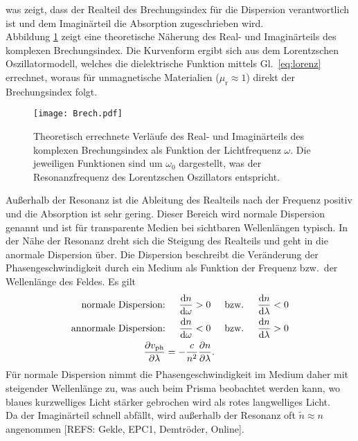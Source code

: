 was zeigt, dass der Realteil des Brechungsindex für die Dispersion verantwortlich ist und dem Imaginärteil die Absorption zugeschrieben wird. \\
Abbildung \ref{fig:brech} zeigt eine theoretische Näherung des Real- und Imaginärteils des komplexen Brechungsindex.
Die Kurvenform ergibt sich aus dem Lorentzschen Oszillatormodell, welches die dielektrische Funktion mittels Gl.~\eqref{eq:lorenz}
errechnet, woraus für unmagnetische Materialien ($\mu_{\text{r}} \approx 1$) direkt der Brechungsindex folgt. 
\begin{figure}[h!]
    \centering
    \texttt{[image: Brech.pdf]}
    \caption{\label{fig:brech}Theoretisch errechnete Verläufe des Real- und Imaginärteils des 
    komplexen Brechungsindex als Funktion der Lichtfrequenz $\omega$. Die jeweiligen Funktionen 
    sind um $\omega_{0}$ dargestellt, was der Resonanzfrequenz des Lorentzschen Oszillators entspricht.}
\end{figure}\FloatBarrier\newpage
Außerhalb der Resonanz ist die Ableitung des Realteils nach der Frequenz positiv und die Absorption ist 
sehr gering. Dieser Bereich wird normale 
Dispersion genannt und ist für transparente Medien bei sichtbaren Wellenlängen typisch. 
In der Nähe der Resonanz dreht sich die Steigung des Realteils und geht in die anormale Dispersion 
über. Die Dispersion beschreibt die Veränderung der Phasengeschwindigkeit durch ein Medium als Funktion 
der Frequenz bzw.~der Wellenlänge des Feldes. Es gilt
\begin{align}
    \text{normale Dispersion:}&\hspace{0.5cm}\frac{\text{d}n}{\text{d}\omega} > 0\hspace{0.5cm}\text{bzw.}\hspace{0.5cm}\frac{\text{d}n}{\text{d}\lambda} < 0 \\
    \text{annormale Dispersion:}&\hspace{0.5cm}\frac{\text{d}n}{\text{d}\omega} < 0\hspace{0.5cm}\text{bzw.}\hspace{0.5cm}\frac{\text{d}n}{\text{d}\lambda} > 0 \\
    \frac{\partial v_{\text{ph}}}{\partial \lambda} &= - \frac{c}{n^{2}}\frac{\partial n}{\partial \lambda}.
\end{align}
Für normale Dispersion nimmt die Phasengeschwindigkeit im Medium daher mit steigender Wellenlänge zu, was auch beim Prisma 
beobachtet werden kann, wo blaues kurzwelliges Licht stärker gebrochen wird als rotes langwelliges Licht. \\
Da der Imaginärteil schnell abfällt, wird außerhalb der Resonanz oft $\tilde{n} \approx n$ angenommen [REFS: Gekle, EPC1, Demtröder, Online]. \\